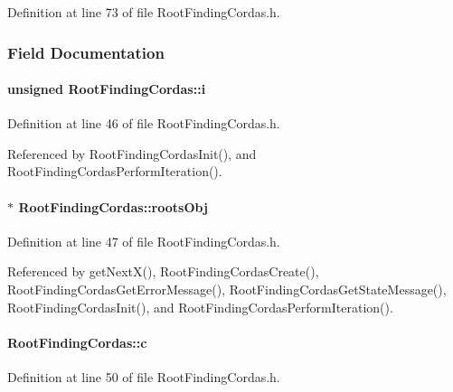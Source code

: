 Definition at line 73 of file RootFindingCordas.h.

\subsubsection{Field Documentation}
\hypertarget{structRootFindingCordas_9715b440ec8443bdfda3ac2d7b388d14}{
\paragraph[i]{\setlength{\rightskip}{0pt plus 5cm}unsigned {\bf RootFindingCordas::i}}\hfill}
\label{structRootFindingCordas_9715b440ec8443bdfda3ac2d7b388d14}




Definition at line 46 of file RootFindingCordas.h.

Referenced by RootFindingCordasInit(), and RootFindingCordasPerformIteration().\hypertarget{structRootFindingCordas_1bb5c50ec0b0e10e0bec0f8eda8df978}{
\paragraph[rootsObj]{$\ast$ {\bf RootFindingCordas::rootsObj}}\hfill}
\label{structRootFindingCordas_1bb5c50ec0b0e10e0bec0f8eda8df978}




Definition at line 47 of file RootFindingCordas.h.

Referenced by getNextX(), RootFindingCordasCreate(), RootFindingCordasGetErrorMessage(), RootFindingCordasGetStateMessage(), RootFindingCordasInit(), and RootFindingCordasPerformIteration().\hypertarget{structRootFindingCordas_b7ab045a5074411ab780f33d934de627}{
\paragraph[c]{ {\bf RootFindingCordas::c}}\hfill}
\label{structRootFindingCordas_b7ab045a5074411ab780f33d934de627}




Definition at line 50 of file RootFindingCordas.h.

